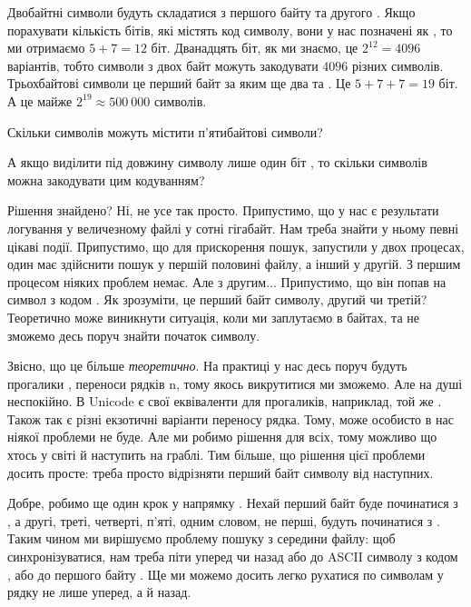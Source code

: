 Двобайтні символи будуть складатися з першого байту  та другого .
Якщо порахувати кількість бітів, які містять код символу, вони у нас позначені як , то ми отримаємо $5+7=12$ біт.
Дванадцять біт, як ми знаємо, це $2^{12}=4096$ варіантів, тобто символи з двох байт можуть закодувати $4096$ різних символів.
Трьохбайтові символи це перший байт  за яким ще два  та .
Це $5+7+7=19$ біт.
А це майже $2^{19} \approx 500~000$ символів.

\begin{exercise}
Скільки символів можуть містити п'ятибайтові символи?
\end{exercise}

\begin{exercise}
А якщо виділити під довжину символу лише один біт , то скільки символів можна закодувати цим кодуванням?
\end{exercise}

Рішення знайдено? Ні, не усе так просто.
Припустимо, що у нас є результати логування у величезному файлі у сотні гігабайт.
Нам треба знайти у ньому певні цікаві події.
Припустимо, що для прискорення пошук, запустили у двох процесах, один має здійснити пошук у першій половині файлу, а інший у другій.
З першим процесом ніяких проблем немає.
Але з другим...
Припустимо, що він попав на символ з кодом .
Як зрозуміти, це перший байт символу, другий чи третій?
Теоретично може виникнути ситуація, коли ми заплутаємо в байтах, та не зможемо десь поруч знайти початок символу.

Звісно, що це більше \textit{теоретично}.
На практиці у нас десь поруч будуть прогалики \chr{\s}, переноси рядків \chesc n, тому якось викрутитися ми зможемо.
Але на душі неспокійно.
В Unicode є свої еквіваленти для прогаликів, наприклад, той же .
Також так є різні екзотичні варіанти переносу рядка.
Тому, може особисто в нас ніякої проблеми не буде.
Але ми робимо рішення для всіх, тому можливо що хтось у світі й наступить на граблі.
Тим більше, що рішення цієї проблеми досить просте: треба просто відрізняти перший байт символу від наступних.

Добре, робимо ще один крок у напрямку .
Нехай перший байт буде починатися з , а другі, треті, четверті, п'яті, одним словом, не перші, будуть починатися з .
Таким чином ми вирішуємо проблему пошуку з середини файлу: щоб синхронізуватися, нам треба піти уперед чи назад або до ASCII символу з кодом , або до першого байту .
Ще ми можемо досить легко рухатися по символам у рядку не лише уперед, а й назад.

